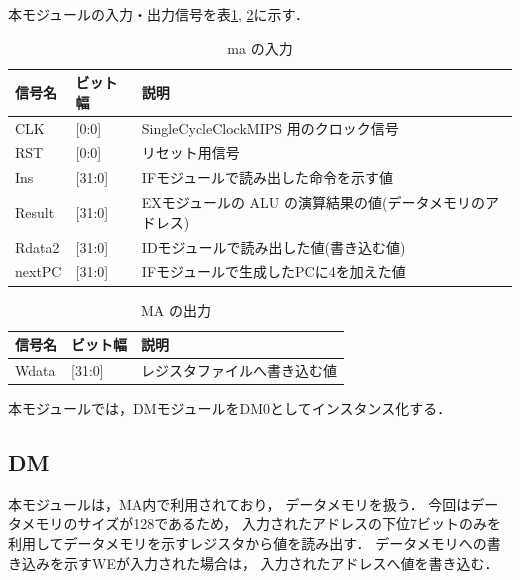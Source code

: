 本モジュールの入力・出力信号を表\ref{tab:ma_input}, \ref{tab:ma_output}に示す．
\begin{table}[h]
  \caption{ma の入力}
  \centering
  \begin{tabular}{l|l|l}
    信号名 & ビット幅 & 説明 \\
    \hline
    CLK & [0:0] & SingleCycleClockMIPS 用のクロック信号 \\
    RST & [0:0] & リセット用信号 \\
    Ins & [31:0] & IFモジュールで読み出した命令を示す値 \\
    Result & [31:0] & EXモジュールの ALU の演算結果の値(データメモリのアドレス) \\
    Rdata2 & [31:0] & IDモジュールで読み出した値(書き込む値) \\
    nextPC & [31:0] & IFモジュールで生成したPCに4を加えた値 \\
  \end{tabular}
  \label{tab:ma_input}
\end{table}
\begin{table}[h]
  \caption{MA の出力}
  \centering
  \begin{tabular}{l|l|l}
    信号名 & ビット幅 & 説明 \\
    \hline
    Wdata & [31:0] & レジスタファイルへ書き込む値 \\
  \end{tabular}
  \label{tab:ma_output}
\end{table}

本モジュールでは，DMモジュールをDM0としてインスタンス化する．

\subsection{DM}
本モジュールは，MA内で利用されており，
データメモリを扱う．
今回はデータメモリのサイズが128であるため，
入力されたアドレスの下位7ビットのみを利用してデータメモリを示すレジスタから値を読み出す．
データメモリへの書き込みを示すWEが入力された場合は，
入力されたアドレスへ値を書き込む．


